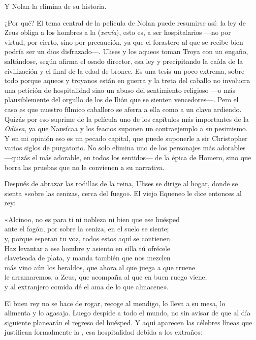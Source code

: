 Y Nolan la elimina de su historia.

¿Por qué? El tema central de la película de Nolan puede resumirse así: la ley de Zeus obliga a los hombres a la  (\emph{xenía}), esto es, a ser hospitalarios ---no por virtud, por cierto, sino por precaución, ya que el forastero al que se recibe bien podría ser un dios disfrazado---. Ulises y los aqueos toman Troya con un engaño, saltándose, según afirma el osado director, esa ley y precipitando la caída de la civilización y el final de la edad de bronce. Es una tesis un poco extrema, sobre todo porque aqueos y troyanos están en guerra y la treta del caballo no involucra una petición de hospitalidad sino un abuso del sentimiento religioso ---o más plausiblemente del orgullo de los de Ilión que se sienten vencedores---. Pero el caso es que nuestro fílmico caballero se aferra a ella como a un clavo ardiendo. Quizás por eso suprime de la película uno de los capítulos más importantes de la \emph{Odisea}, ya que Nausícaa y los feacios suponen un contraejemplo a su pesimismo. Y en mi opinión eso es un pecado capital, que puede suponerle a sir Christopher varios siglos de purgatorio. No solo elimina uno de los personajes más adorables ---quizás el más adorable, en todos los sentidos--- de la épica de Homero, sino que borra las pruebas que no le convienen a su narrativa.

Después de abrazar las rodillas de la reina, Ulises se dirige al hogar, donde se sienta «sobre las cenizas, cerca del fuego».
El viejo Equeneo le dice entonces al rey:

\begin{versocita}
«Alcínoo, no es para ti ni nobleza ni bien que ese huésped\\
ante el fogón, por sobre la ceniza, en el suelo se siente;\\
y, porque esperan tu voz, todos estos aquí se contienen.\\
Haz levantar a ese hombre y asiento en silla tú ofrécele\\
claveteada de plata, y manda también que nos mezclen\\
más vino aún los heraldos, que ahora al que juega a que truene\\
le arramaremos, a Zeus, que acompaña al que en buen ruego viene;\\
y al extranjero comida dé el ama de lo que almacene».
\end{versocita}

El buen rey no se hace de rogar, recoge al mendigo, lo lleva a su mesa, lo alimenta y lo agasaja. Luego despide a todo el mundo, no sin avisar de que al día siguiente planearán el regreso del huésped. Y aquí aparecen las célebres líneas que justifican formalmente la , esa hospitalidad debida a los extraños:

